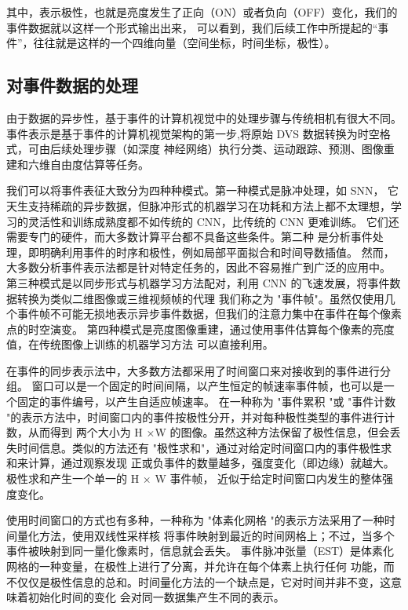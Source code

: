 其中，表示极性，也就是亮度发生了正向（ON）或者负向（OFF）变化，我们的事件数据就以这样一个形式输出出来，
可以看到，我们后续工作中所提起的“事件”，往往就是这样的一个四维向量（空间坐标，时间坐标，极性）。

\subsection{对事件数据的处理}
由于数据的异步性，基于事件的计算机视觉中的处理步骤与传统相机有很大不同。
事件表示是基于事件的计算机视觉架构的第一步,将原始 DVS 数据转换为时空格式，可由后续处理步骤（如深度
神经网络）执行分类、运动跟踪、预测、图像重建和六维自由度估算等任务。

我们可以将事件表征大致分为四种种模式。第一种模式是脉冲处理，如 SNN，
它天生支持稀疏的异步数据，但脉冲形式的机器学习在功耗和方法上都不太理想，学习的灵活性和训练成熟度都不如传统的 CNN，比传统的 CNN 更难训练。
它们还需要专门的硬件，而大多数计算平台都不具备这些条件。第二种
是分析事件处理，即明确利用事件的时序和极性，例如局部平面拟合和时间导数插值。
然而，大多数分析事件表示法都是针对特定任务的，因此不容易推广到广泛的应用中。
第三种模式是以同步形式与机器学习方法配对，利用 CNN 的飞速发展，将事件数据转换为类似二维图像或三维视频帧的代理
我们称之为 "事件帧"。虽然仅使用几个事件帧不可能无损地表示异步事件数据，但我们的注意力集中在事件在每个像素点的时空演变。
第四种模式是亮度图像重建，通过使用事件估算每个像素的亮度值，在传统图像上训练的机器学习方法
可以直接利用。\cite{baldwin2022time}

在事件的同步表示法中，大多数方法都采用了时间窗口来对接收到的事件进行分组。
窗口可以是一个固定的时间间隔，以产生恒定的帧速率事件帧，也可以是一个固定的事件编号，以产生自适应帧速率。
在一种称为 "事件累积 "或 "事件计数 "的表示方法中，时间窗口内的事件按极性分开，并对每种极性类型的事件进行计数，从而得到
两个大小为 H ×W 的图像。虽然这种方法保留了极性信息，但会丢失时间信息。类似的方法还有 "极性求和"，通过对给定时间窗口内的事件极性求和来计算，通过观察发现
正或负事件的数量越多，强度变化（即边缘）就越大。极性求和产生一个单一的 H × W 事件帧，
近似于给定时间窗口内发生的整体强度变化。

使用时间窗口的方式也有多种，一种称为 "体素化网格 "的表示方法采用了一种时间量化方法，使用双线性采样核
将事件映射到最近的时间网格上；不过，当多个事件被映射到同一量化像素时，信息就会丢失。
事件脉冲张量（EST）是体素化网格的一种变量，在极性上进行了分离，并允许在每个体素上执行任何
功能，而不仅仅是极性信息的总和。时间量化方法的一个缺点是，它对时间并非不变，这意味着初始化时间的变化
会对同一数据集产生不同的表示。

